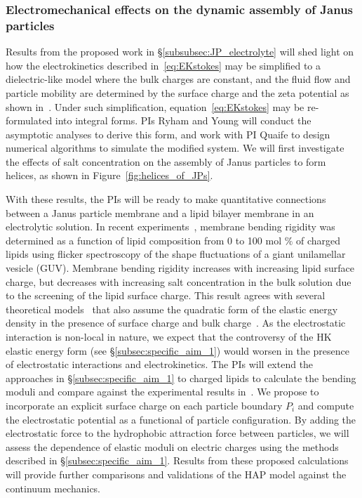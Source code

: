 \subsubsection{Electromechanical effects on the dynamic assembly of Janus particles \label{subsubsec:em_effects}}
Results from the proposed work in \S\ref{subsubsec:JP_electrolyte} will
shed light on how the electrokinetics described in~\eqref{eq:EKstokes}
may be simplified to a dielectric-like model where the bulk charges are
constant, and the fluid flow and particle mobility are determined by the
surface charge and the zeta potential as shown in~\cite{Mori2018_JFM}.
Under such simplification, equation~\eqref{eq:EKstokes} may be
re-formulated into integral forms. PIs Ryham and Young will conduct the
asymptotic analyses to derive this form, and work with PI Quaife to
design numerical algorithms to simulate the modified system. We will
first investigate the effects of salt concentration on the assembly of
Janus particles to form helices, as shown in
Figure~\ref{fig:helices_of_JPs}.

With these results, the PIs will be ready to make quantitative
connections between a Janus particle membrane and a lipid bilayer
membrane in an electrolytic solution. In recent
experiments~\cite{FaizEtAl2019_SoftMatt}, membrane bending rigidity was
determined as a function of lipid composition from 0 to 100 mol $\%$ of
charged lipids using flicker spectroscopy of the shape fluctuations of a
giant unilamellar vesicle (GUV). Membrane bending rigidity increases
with increasing lipid surface charge, but decreases with increasing salt
concentration in the bulk solution due to the screening of the lipid
surface charge. This result agrees with several theoretical
models~\cite{Kralchevsky1996_JCIS, May1996_JChemPhys,
LoubetEtAl2013_PRE} that also assume the quadratic form of the elastic
energy density in the presence of surface charge and bulk
charge~\cite{DuplantierGoldstein1990_PRL, Winterhalter1992_JPC}. As the
electrostatic interaction is non-local in nature, we expect that the
controversy of the HK elastic energy form (see
\S\ref{subsec:specific_aim_1}) would worsen in the presence of
electrostatic interactions and electrokinetics. The PIs will extend the
approaches in \S\ref{subsec:specific_aim_1} to charged lipids to
calculate the bending moduli and compare against the experimental
results in~\cite{FaizEtAl2019_SoftMatt}. We propose to incorporate an
explicit surface charge on each particle boundary $P_i$ and compute the
electrostatic potential as a functional of particle configuration.  By
adding the electrostatic force to the hydrophobic attraction force
between particles, we will assess the dependence of elastic moduli on
electric charges using the methods described in
\S\ref{subsec:specific_aim_1}. Results from these proposed calculations
will provide further comparisons and validations of the HAP model
against the continuum mechanics.

